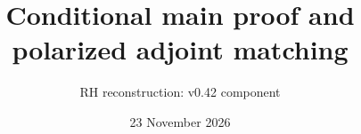 \documentclass[11pt,a4paper]{article}
\begin{document}
\title{Conditional main proof and polarized adjoint matching}
\author{RH reconstruction: v0.42 component}
\date{23 November 2026}
\maketitle

\end{document}
